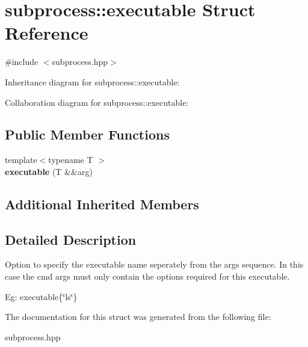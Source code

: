 \hypertarget{structsubprocess_1_1executable}{}\section{subprocess\+:\+:executable Struct Reference}
\label{structsubprocess_1_1executable}


{\ttfamily \#include $<$subprocess.\+hpp$>$}



Inheritance diagram for subprocess\+:\+:executable\+:


Collaboration diagram for subprocess\+:\+:executable\+:
\subsection*{Public Member Functions}
\begin{DoxyCompactItemize}
\item 
\mbox{\label{structsubprocess_1_1executable_a77b5eed2a3fc35519fde3afb4e5c8a70}} 
{\footnotesize template$<$typename T $>$ }\\{\bfseries executable} (T \&\&arg)
\end{DoxyCompactItemize}
\subsection*{Additional Inherited Members}


\subsection{Detailed Description}
Option to specify the executable name seperately from the args sequence. In this case the cmd args must only contain the options required for this executable.

Eg\+: executable\{\char`\"{}ls\char`\"{}\} 

The documentation for this struct was generated from the following file\+:\begin{DoxyCompactItemize}
\item 
subprocess.\+hpp\end{DoxyCompactItemize}
